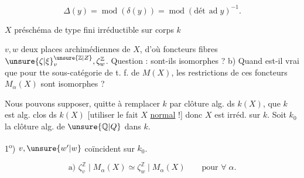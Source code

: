 \[
\Delta(y)=\operatorname{mod}(\delta(y))=\operatorname{mod}(\text{dét}\,\operatorname{ad}y)^{-1}. \tag*{(35)}
\]

$X$  préschéma de type fini  irréductible sur corps $k$

$v,w$ deux places archimédiennes de  $X$, d'où foncteurs fibres $\unsure{\zeta|\xi}^{\unsure{\mathbb{Z}|Z}}_v,\zeta^{\mathbb{Z}}_w$. Question :  sont-ils isomorphes ? b)  Quand est-il vrai que pour tte sous-catégorie  de t. f. de $M(X)$, les restrictions de ces foncteurs  $M_\alpha(X)$ sont isomorphes ?

Nous pouvons supposer, quitte à remplacer $k$ par   clôture alg. ds $k(X)$, que $k$ est alg. clos ds $k(X)$ [utiliser le fait $X$ \uline{normal} !] donc $X$ est  irréd. sur $k$. Soit  $k_0$ la clôture alg. de $\unsure{\mathbb{Q}|Q}$ dans $k$.





1\textsuperscript{o}) $v,\unsure{w'|w}$ coïncident sur $k_0$.

\[
\text{a) }\zeta^{\mathbb{Z}}_v\mid M_\alpha(X)\simeq\zeta^{\mathbb{Z}}_w\mid M_\alpha(X)\qquad\text{pour }\forall\;\alpha.
\]


